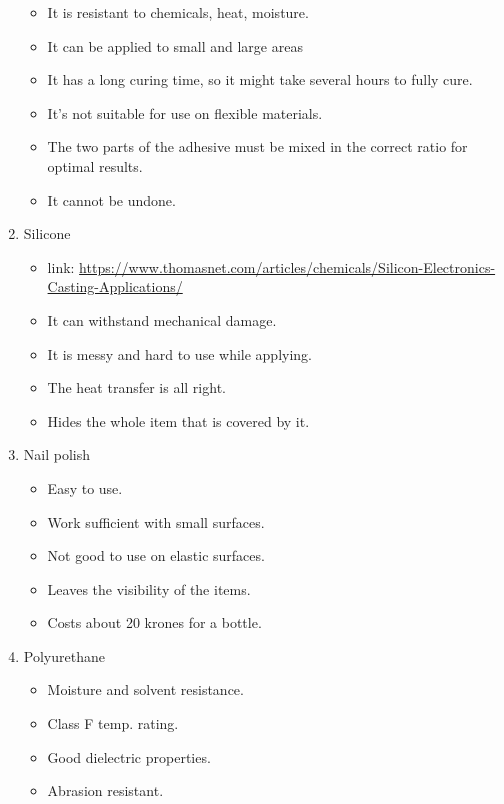 \documentclass{article}[10pt]
\begin{document}
\begin{enumerate}
\begin{itemize}
              \item It is resistant to chemicals, heat, moisture.
              \item It can be applied to small and large areas
              \item It has a long curing time, so it might take several hours to fully cure.
              \item It's not suitable for use on flexible materials.
              \item The two parts of the adhesive must be mixed in the correct ratio for optimal results.
              \item It cannot be undone.
          \end{itemize}
    \item Silicone
          \begin{itemize}
              \item link: \url{https://www.thomasnet.com/articles/chemicals/Silicon-Electronics-Casting-Applications/}
              \item It can withstand mechanical damage.
              \item It is messy and hard to use while applying.
              \item The heat transfer is all right.
              \item Hides the whole item that is covered by it.
          \end{itemize}
    \item Nail polish
          \begin{itemize}
              \item Easy to use.
              \item Work sufficient with small surfaces.
              \item Not good to use on elastic surfaces.
              \item Leaves the visibility of the items.
              \item Costs about 20 krones for a bottle.
          \end{itemize}
    \item Polyurethane
          \begin{itemize}
              \item Moisture and solvent resistance.
              \item Class F temp. rating.
              \item Good dielectric properties.
              \item Abrasion resistant.

\end{itemize}
\end{enumerate}
\end{document}
